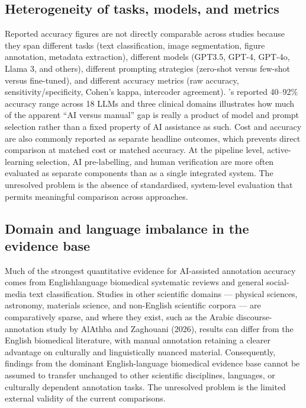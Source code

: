 \documentclass[acmsmall,nonacm]{acmart}
\begin{document}
\subsection{Heterogeneity of tasks, models, and metrics}
\label{subsec:heterogeneity}

Reported accuracy figures are not directly comparable across studies because they span different tasks (text classification, image segmentation, figure annotation, metadata extraction), different models (GPT3.5, GPT-4, GPT-4o, Llama 3, and others), different prompting strategies (zero-shot versus few-shot versus fine-tuned), and different accuracy metrics (raw accuracy, sensitivity/specificity, Cohen's kappa, intercoder agreement). \citeauthor{delgadochaves2025large}'s reported 40--92\% accuracy range across 18 LLMs and three clinical domains illustrates how much of the apparent ``AI versus manual'' gap is really a product of model and prompt selection rather than a fixed property of AI assistance as such. Cost and accuracy are also commonly reported as separate headline outcomes, which prevents direct comparison at matched cost or matched accuracy. At the pipeline level, active-learning selection, AI pre-labelling, and human verification are more often evaluated as separate components than as a single integrated system. The unresolved problem is the absence of standardised, system-level evaluation that permits meaningful comparison across approaches.

\subsection{Domain and language imbalance in the evidence base}
\label{subsec:domain-language-imbalance}

Much of the strongest quantitative evidence for AI-assisted annotation accuracy comes from Englishlanguage biomedical systematic reviews and general social-media text classification. Studies in other scientific domains --- physical sciences, astronomy, materials science, and non-English scientific corpora --- are comparatively sparse, and where they exist, such as the Arabic discourse-annotation study by AlAthba and Zaghouani (2026), results can differ from the English biomedical literature, with manual annotation retaining a clearer advantage on culturally and linguistically nuanced material. Consequently, findings from the dominant English-language biomedical evidence base cannot be assumed to transfer unchanged to other scientific disciplines, languages, or culturally dependent annotation tasks. The unresolved problem is the limited external validity of the current comparisons.
\end{document}

